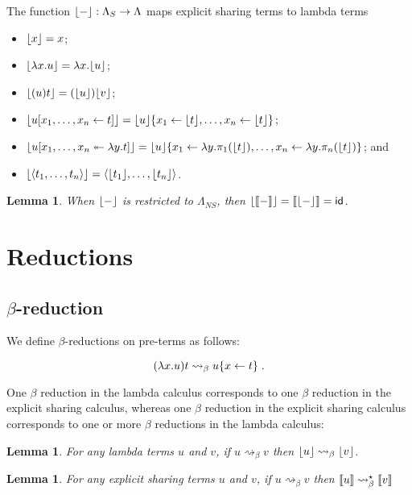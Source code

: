 \documentclass[11pt,a4paper]{article}
\theoremstyle{definition}
\theoremstyle{plain}
\newtheorem{lemma}[definition]{Lemma}
\theoremstyle{remark}
\begin{document}
The function ${\lfloor{-}\rfloor}:\Lambda_S\rightarrow\Lambda$ maps explicit sharing terms to lambda terms

\begin{itemize}
	\item ${\lfloor{x}\rfloor}=x$;
	\item ${\lfloor{\lambda x.u}\rfloor}=\lambda x.{\lfloor{u}\rfloor}$;
	\item ${\lfloor{(u)t}\rfloor}=({\lfloor{u}\rfloor}){\lfloor{v}\rfloor}$;
	\item ${\lfloor{ {  { {u}[{{x_1},\dots,{x_n}}\leftarrow{t}] }  } }\rfloor}={{{\lfloor{u}\rfloor}}\{{x_1}\leftarrow{{\lfloor{t}\rfloor}},\dots,{x_n}\leftarrow{{\lfloor{t}\rfloor}}\}}$;
	\item ${\lfloor{ {  { {u}[{{x_1},\dots,{x_n}}\twoheadleftarrow{\lambda{y}.{t}}] }  } }\rfloor}={{{\lfloor{u}\rfloor}}\{{x_1}\leftarrow{\lambda y.{\pi_{1}({{\lfloor{t}\rfloor}})}},\dots,{x_n}\leftarrow{\lambda y.{\pi_{n}({{\lfloor{t}\rfloor}})}}\}}$; and
	\item ${\lfloor{{\langle{t_1},\dots,{t_n}{\rangle}}}\rfloor}={\langle{{\lfloor{t_1}\rfloor}},\dots,{{\lfloor{t_n}\rfloor}}{\rangle}}$.
\end{itemize}

\begin{lemma}
 When ${\lfloor{-}\rfloor}$ is restricted to $\Lambda_{NS}$, then ${\lfloor{{\llbracket{-}\rrbracket}}\rfloor}={\llbracket{{\lfloor{-}\rfloor}}\rrbracket}=\mathsf{id}$.
\end{lemma}


\section{Reductions}

\subsection{$\beta$-reduction}

We define $\beta$-reductions on pre-terms as follows:

\[(\lambda x.u)t \rightsquigarrow_\beta {{u}\{{x}\leftarrow{t}\}}\;.\]

One $\beta$ reduction in the lambda calculus corresponds to one $\beta$ reduction in the explicit sharing calculus, whereas one $\beta$ reduction in the explicit sharing calculus corresponds to one or more $\beta$ reductions in the lambda calculus:

\begin{lemma}
For any lambda terms $u$ and $v$, if $u\rightsquigarrow_\beta v$ then ${\lfloor{u}\rfloor}\rightsquigarrow_\beta{\lfloor{v}\rfloor}$.
\end{lemma}

\begin{lemma}
For any explicit sharing terms $u$ and $v$, if $u\rightsquigarrow_\beta v$ then ${\llbracket{u}\rrbracket}\rightsquigarrow^\star_\beta{\llbracket{v}\rrbracket}$
\end{lemma}
\end{document}
